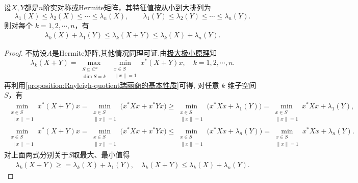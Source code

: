 \documentclass[../../main.tex]{subfiles}%
\begin{document}
\begin{theorem}[Weyl不等式]\label{theorem:Weyl不等式}
设$X,Y$都是$n$阶实对称或Hermite矩阵，其特征值按从小到大排列为
\[
\lambda_1(X)\leqslant \lambda_2(X)\leqslant \cdots \leqslant \lambda_n(X),\qquad
\lambda_1(Y)\leqslant \lambda_2(Y)\leqslant \cdots \leqslant \lambda_n(Y).
\]
则对每个 $k=1,2,\cdots,n$，有
\begin{align*}
\lambda_k(X)+\lambda_1(Y)\leqslant \lambda_k(X+Y)\leqslant \lambda_k(X)+\lambda_n(Y). 
\end{align*}
\end{theorem}
\begin{proof}

不妨设$A$是Hermite矩阵,其他情况同理可证.由\hyperref[theorem:Courant-Fischer的Hermite特征值极大极小原理]{极大极小原理}知
\[
\lambda_k(X+Y)=\max_{\substack{
S\subseteq \mathbb{C}^n\\
\dim S=k}}\min_{\substack{x\in S
\\
\|x\|=1}} x^*(X+Y)x,\quad k=1,2,\cdots,n.
\]
再利用\cref{proposition:Rayleigh-quotient瑞丽商的基本性质}可得,
对任意 $k$ 维子空间 $S$，有
\begin{gather*}
\min_{\substack{x\in S
\\
\|x\|=1}} x^*(X+Y)x
=\min_{\substack{x\in S
\\
\|x\|=1}}\bigl(x^*Xx+x^*Yx\bigr)\geqslant \min_{\substack{x\in S
\\
\|x\|=1}}\bigl(x^*Xx+\lambda_1(Y)\bigr)=\min_{\substack{x\in S
\\
\|x\|=1}} x^*Xx+\lambda_1(Y),\\
\min_{\substack{x\in S
\\
\|x\|=1}} x^*(X+Y)x
=\min_{\substack{x\in S
\\
\|x\|=1}}\bigl(x^*Xx+x^*Yx\bigr)\leqslant \min_{\substack{x\in S
\\
\|x\|=1}}\bigl(x^*Xx+\lambda_n(Y)\bigr)=\min_{\substack{x\in S
\\
\|x\|=1}} x^*Xx+\lambda_n(Y).
\end{gather*}
对上面两式分别关于$S$取最大、最小值得
\begin{align*}
\lambda_k(X+Y)\geqslant=\lambda_k(X)+\lambda_1(Y),\quad \lambda_k(X+Y)
\leqslant\lambda_k(X)+\lambda_n(Y).
\end{align*}
\end{proof}
\end{document}
